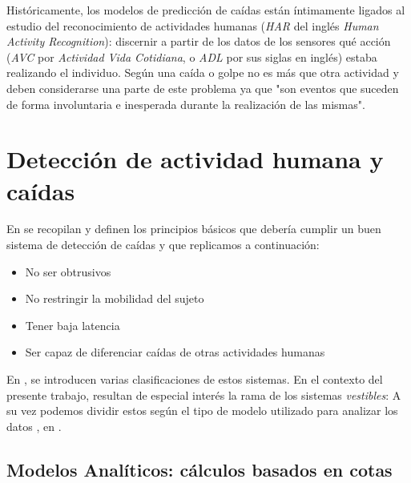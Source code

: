 \documentclass[../tfm.tex]{subfiles}
\begin{document}
Históricamente, los modelos de predicción de caídas están íntimamente ligados al estudio del reconocimiento de actividades humanas (\textit{HAR} del inglés \textit{Human Activity Recognition}): discernir a partir de los datos de los sensores qué acción (\textit{AVC} por \textit{Actividad Vida Cotidiana}, o \textit{ADL} por sus siglas en inglés) estaba realizando el individuo. Según \cite[p.10692]{Ozdemir2014} una caída o golpe no es más que otra actividad y deben considerarse una parte de este problema ya que "son eventos que suceden de forma involuntaria e inesperada durante la realización de las mismas".


\section{Detección de actividad humana y caídas}\label{sect:sa_har}

En \cite[p.2]{Anita2020} se recopilan y definen los principios básicos que debería cumplir un buen sistema de detección de caídas y que replicamos a continuación:

\begin{itemize}
  \item No ser obtrusivos
  \item No restringir la mobilidad del sujeto
  \item Tener baja latencia
  \item Ser capaz de diferenciar caídas de otras actividades humanas
\end{itemize}

En \cite{Musci2020,Anita2020}, se introducen varias clasificaciones de estos sistemas. En el contexto del presente trabajo, resultan de especial interés la rama de los sistemas \textit{vestibles}:  A su vez podemos dividir estos según el tipo de modelo utilizado para analizar los datos \cite{Anita2020,Lim2014}, en .

\subsection{Modelos Analíticos: cálculos basados en cotas}\label{sa_modelos_analiticos}
\end{document}
